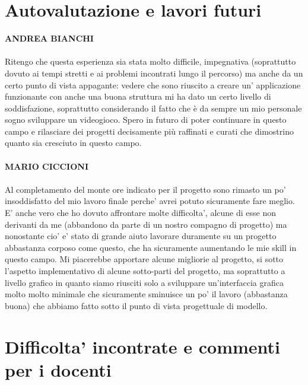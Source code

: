 \documentclass[a4paper,12pt]{report}
\begin{document}
\section{Autovalutazione e lavori futuri}
\textbf{ANDREA BIANCHI}
\\ \\
Ritengo che questa esperienza sia stata molto difficile, impegnativa (soprattutto dovuto ai tempi stretti e ai problemi incontrati lungo il percorso) ma anche da un certo punto di vista appagante: vedere che sono riuscito a creare un' applicazione funzionante con anche una buona struttura mi ha dato un certo livello di soddisfazione, soprattutto considerando il fatto che è da sempre un mio personale sogno sviluppare un videogioco. Spero in futuro di poter continuare in questo campo e rilasciare dei progetti decisamente più raffinati e curati che dimostrino quanto sia cresciuto in questo campo.
\\ \\
\textbf{MARIO CICCIONI}
\\ \\
Al completamento del monte ore indicato per il progetto sono rimasto un po' insoddisfatto del mio lavoro finale perche' avrei potuto sicuramente fare meglio. E' anche vero che ho dovuto affrontare molte difficolta', alcune di esse non derivanti da me (abbandono da parte di un nostro compagno di progetto) ma nonostante cio' e' stato di grande aiuto lavorare duramente su un progetto abbastanza corposo come questo, che ha sicuramente aumentando le mie skill in questo campo. Mi piacerebbe apportare alcune migliorie al progetto, si sotto l'aspetto implementativo di alcune sotto-parti del progetto, ma soprattutto a livello grafico in quanto siamo riusciti solo a sviluppare un'interfaccia grafica molto molto minimale che sicuramente sminuisce un po' il lavoro (abbastanza buona) che abbiamo fatto sotto il punto di vista progettuale di modello.
\section{Difficolta' incontrate e commenti per i docenti}
\end{document}
